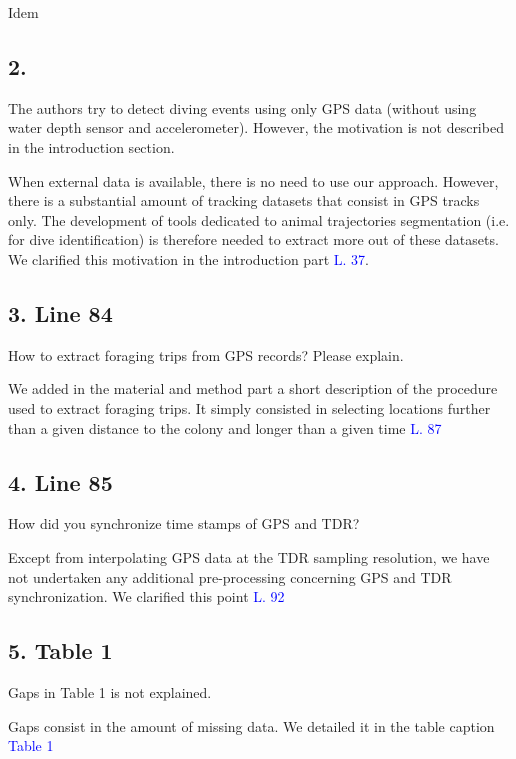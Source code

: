 \documentclass{ar2rc}
\begin{document}
\AR Idem

\subsection*{2.}

\RC The authors try to detect diving events using only GPS data (without using water depth sensor and accelerometer). However, the motivation is not described in the introduction section.

\AR When external data is available, there is no need to use our approach. However, there is a substantial amount of tracking datasets that consist in GPS tracks only. The development of tools dedicated to animal trajectories segmentation (i.e. for dive identification) is therefore needed to extract more out of these datasets. We clarified this motivation in the introduction part \textcolor{blue}{L. 37}.

\subsection*{3. Line 84}

\RC How to extract foraging trips from GPS records? Please explain.

\AR We added in the material and method part a short description of the procedure used to extract foraging trips. It simply consisted in selecting locations further than a given distance to the colony and longer than a given time \textcolor{blue}{L. 87}

\subsection*{4. Line 85}

\RC How did you synchronize time stamps of GPS and TDR?

\AR Except from interpolating GPS data at the TDR sampling resolution, we have not undertaken any additional pre-processing concerning GPS and TDR synchronization.  We clarified this point \textcolor{blue}{L. 92}

\subsection*{5. Table 1}

\RC Gaps in Table 1 is not explained.

\AR  Gaps consist in the amount of missing data. We detailed it in the table caption \textcolor{blue}{Table 1}
\end{document}
